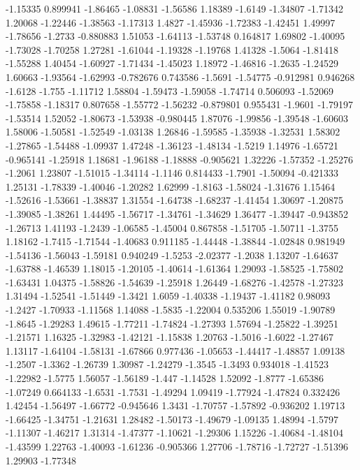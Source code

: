 \documentclass[9pt]{article}
\theoremstyle{plain}
\theoremstyle{definition}
\theoremstyle{remark}
\numberwithin{equation}{section}
\begin{document}
-1.15335
0.899941
-1.86465
-1.08831
-1.56586
1.18389
-1.6149
-1.34807
-1.71342
1.20068
-1.22446
-1.38563
-1.17313
1.4827
-1.45936
-1.72383
-1.42451
1.49997
-1.78656
-1.2733
-0.880883
1.51053
-1.64113
-1.53748
0.164817
1.69802
-1.40095
-1.73028
-1.70258
1.27281
-1.61044
-1.19328
-1.19768
1.41328
-1.5064
-1.81418
-1.55288
1.40454
-1.60927
-1.71434
-1.45023
1.18972
-1.46816
-1.2635
-1.24529
1.60663
-1.93564
-1.62993
-0.782676
0.743586
-1.5691
-1.54775
-0.912981
0.946268
-1.6128
-1.755
-1.11712
1.58804
-1.59473
-1.59058
-1.74714
0.506093
-1.52069
-1.75858
-1.18317
0.807658
-1.55772
-1.56232
-0.879801
0.955431
-1.9601
-1.79197
-1.53514
1.52052
-1.80673
-1.53938
-0.980445
1.87076
-1.99856
-1.39548
-1.60603
1.58006
-1.50581
-1.52549
-1.03138
1.26846
-1.59585
-1.35938
-1.32531
1.58302
-1.27865
-1.54488
-1.09937
1.47248
-1.36123
-1.48134
-1.5219
1.14976
-1.65721
-0.965141
-1.25918
1.18681
-1.96188
-1.18888
-0.905621
1.32226
-1.57352
-1.25276
-1.2061
1.23807
-1.51015
-1.34114
-1.1146
0.814433
-1.7901
-1.50094
-0.421333
1.25131
-1.78339
-1.40046
-1.20282
1.62999
-1.8163
-1.58024
-1.31676
1.15464
-1.52616
-1.53661
-1.38837
1.31554
-1.64738
-1.68237
-1.41454
1.30697
-1.20875
-1.39085
-1.38261
1.44495
-1.56717
-1.34761
-1.34629
1.36477
-1.39447
-0.943852
-1.26713
1.41193
-1.2439
-1.06585
-1.45004
0.867858
-1.51705
-1.50711
-1.3755
1.18162
-1.7415
-1.71544
-1.40683
0.911185
-1.44448
-1.38844
-1.02848
0.981949
-1.54136
-1.56043
-1.59181
0.940249
-1.5253
-2.02377
-1.2038
1.13207
-1.64637
-1.63788
-1.46539
1.18015
-1.20105
-1.40614
-1.61364
1.29093
-1.58525
-1.75802
-1.63431
1.04375
-1.58826
-1.54639
-1.25918
1.26449
-1.68276
-1.42578
-1.27323
1.31494
-1.52541
-1.51449
-1.3421
1.6059
-1.40338
-1.19437
-1.41182
0.98093
-1.2427
-1.70933
-1.11568
1.14088
-1.5835
-1.22004
0.535206
1.55019
-1.90789
-1.8645
-1.29283
1.49615
-1.77211
-1.74824
-1.27393
1.57694
-1.25822
-1.39251
-1.21571
1.16325
-1.32983
-1.42121
-1.15838
1.20763
-1.5016
-1.6022
-1.27467
1.13117
-1.64104
-1.58131
-1.67866
0.977436
-1.05653
-1.44417
-1.48857
1.09138
-1.2507
-1.3362
-1.26739
1.30987
-1.24279
-1.3545
-1.3493
0.934018
-1.41523
-1.22982
-1.5775
1.56057
-1.56189
-1.447
-1.14528
1.52092
-1.8777
-1.65386
-1.07249
0.664133
-1.6531
-1.7531
-1.49294
1.09419
-1.77924
-1.47824
0.332426
1.42454
-1.56497
-1.66772
-0.945646
1.3431
-1.70757
-1.57892
-0.936202
1.19713
-1.66425
-1.34751
-1.21631
1.28482
-1.50173
-1.49679
-1.09135
1.48994
-1.5797
-1.11307
-1.46217
1.31314
-1.47377
-1.10621
-1.29306
1.15226
-1.40684
-1.48104
-1.43599
1.22763
-1.40093
-1.61236
-0.905366
1.27706
-1.78716
-1.72727
-1.51396
1.29903
-1.77348
\end{document}

